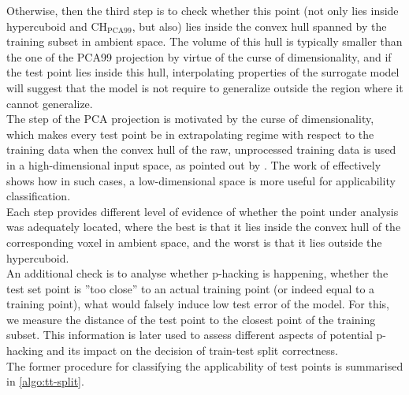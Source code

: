 % 
\indent Otherwise, then the third step is to check whether this point (not only lies inside hypercuboid and $\text{CH}_\text{PCA99}$, but also) lies inside the convex hull spanned by the training subset in ambient space. The volume of this hull is typically smaller than the one of the PCA99 projection by virtue of the curse of dimensionality, and if the test point lies inside this hull, interpolating properties of the surrogate model will suggest that the model is not require to generalize outside the region where it cannot generalize.\\
%
The step of the PCA projection is motivated by the curse of dimensionality, which makes every test point be in extrapolating regime with respect to the training data when the convex hull of the raw, unprocessed training data is used in a high-dimensional input space, as pointed out by \cite{balestriero2021learning}. The work of \cite{bonnasse2022interpolation} effectively shows how in such cases, a low-dimensional space is more useful for applicability classification.\\
%
\indent Each step provides different level of evidence of whether the point under analysis was adequately located, where the best is that it lies inside the convex hull of the corresponding voxel in ambient space, and the worst is that it lies outside the hypercuboid.\\
%
\indent An additional check is to analyse whether p-hacking is happening, \ie whether the test set point is ''too close'' to an actual training point (or indeed equal to a training point), what would falsely induce low test error of the model. For this, we measure the distance of the test point to the closest point of the training subset. This information is later used to assess different aspects of potential p-hacking and its impact on the decision of train-test split correctness.\\
%
\indent The former procedure for classifying the applicability of test points is summarised in \autoref{algo:tt-split}.\\
